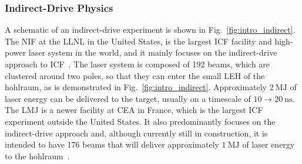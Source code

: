 \subsubsection{Indirect-Drive Physics}%
\label{sec:intro_indirect_phys}

A schematic of an indirect-drive experiment is shown in Fig.~\ref{fig:intro_indirect}.
The \ac{NIF} at the \ac{LLNL} in the United States, is the largest \ac{ICF} facility and high-power laser system in the world, and it mainly focuses on the indirect-drive approach to \ac{ICF}~\cite{miller_national_2004,spaeth_description_2016}.
The laser system is composed of 192 beams, which are clustered around two poles, so that they can enter the small \ac{LEH} of the hohlraum, as is demonstrated in Fig.~\ref{fig:intro_indirect}.
Approximately $2\ \text{MJ}$ of laser energy can be delivered to the target, usually on a timescale of $10\rightarrow20\ \text{ns}$.
The \ac{LMJ} is a newer facility at \ac{CEA} in France, which is the largest \ac{ICF} experiment outside the United States.
It also predominantly focuses on the indirect-drive approach and, although currently still in construction, it is intended to have 176 beams that will deliver approximately $1\ \text{MJ}$ of laser energy to the hohlraum~\cite{fleurot_laser_2005}.


